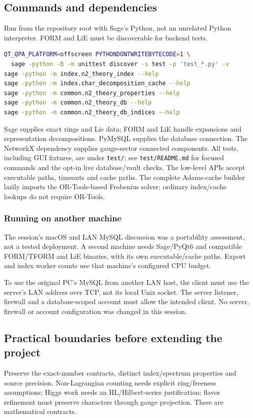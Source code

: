 \documentclass[11pt,a4paper]{article}
\numberwithin{equation}{section}
\newcommand{\code}[1]{{\small\nolinkurl{#1}}}
\begin{document}
\subsection{Commands and dependencies}
Run from the repository root with Sage's Python, not an unrelated Python
interpreter. FORM and LiE must be discoverable for backend tests.
\begin{lstlisting}[language=bash]
QT_QPA_PLATFORM=offscreen PYTHONDONTWRITEBYTECODE=1 \
  sage -python -B -m unittest discover -s test -p 'test_*.py' -v
sage -python -m index.n2_theory_index --help
sage -python -m index.char_decomposition_cache --help
sage -python -m common.n2_theory_properties --help
sage -python -m common.n2_theory_db --help
sage -python -m common.n2_theory_db_indices --help
\end{lstlisting}
Sage supplies exact rings and Lie data; FORM and LiE handle expansions and
representation decompositions. PyMySQL supplies the database connection. The
NetworkX dependency supplies gauge-sector connected components. All tests,
including GUI fixtures, are under \code{test/}; see \code{test/README.md} for
focused commands and the opt-in live database/vault checks. The
low-level APIs accept executable paths, timeouts and cache paths. The complete
Adams-cache builder lazily imports the OR-Tools-based Frobenius solver; ordinary
index/cache lookups do not require OR-Tools.

\subsubsection{Running on another machine}
The session's macOS and LAN MySQL discussion was a portability assessment,
not a tested deployment. A second machine needs Sage/PyQt6 and compatible
FORM/TFORM and LiE binaries, with its own executable/cache paths. Export and
index worker counts use that machine's configured CPU budget.

To use the original PC's MySQL from another LAN host, the client must use the
server's LAN address over TCP, not its local Unix socket. The server listener,
firewall and a database-scoped account must allow the intended client. No
server, firewall or account configuration was changed in this session.

\subsection{Practical boundaries before extending the project}
Preserve the exact-number contracts, distinct index/spectrum properties and
source precision. Non-Lagrangian counting needs explicit ring/freeness assumptions;
Higgs work needs an HL/Hilbert-series justification; flavor refinement must
preserve characters through gauge projection. These are mathematical contracts.
\end{document}
